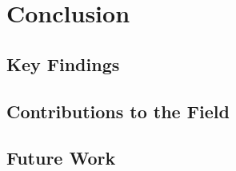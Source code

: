 %
\chapter{Conclusion}
\label{sec:conclusion}


\section{Key Findings}
\label{sec:conclusion:findings}


\section{Contributions to the Field}
\label{sec:conclusion:contributions}

\section{Future Work}
\label{sec:conclusion:future}

